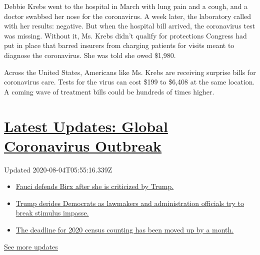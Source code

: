 Debbie Krebs went to the hospital in March with lung pain and a cough,
and a doctor swabbed her nose for the coronavirus. A week later, the
laboratory called with her results: negative. But when the hospital bill
arrived, the coronavirus test was missing. Without it, Ms. Krebs didn't
qualify for protections Congress had put in place that barred insurers
from charging patients for visits meant to diagnose the coronavirus. She
was told she owed \$1,980.

Across the United States, Americans like Ms. Krebs are receiving
surprise bills for coronavirus care. Tests for the virus can cost \$199
to \$6,408 at the same location. A coming wave of treatment bills could
be hundreds of times higher.

\hypertarget{latest-updates-global-coronavirus-outbreak}{%
\section{\texorpdfstring{\href{https://www.nytimes.com/2020/08/03/world/coronavirus-covid-19.html?action=click\&pgtype=Article\&state=default\&region=MAIN_CONTENT_1\&context=storylines_live_updates}{Latest
Updates: Global Coronavirus
Outbreak}}{Latest Updates: Global Coronavirus Outbreak}}\label{latest-updates-global-coronavirus-outbreak}}

Updated 2020-08-04T05:55:16.339Z

\begin{itemize}
\tightlist
\item
  \href{https://www.nytimes.com/2020/08/03/world/coronavirus-covid-19.html?action=click\&pgtype=Article\&state=default\&region=MAIN_CONTENT_1\&context=storylines_live_updates\#link-4547638f}{Fauci
  defends Birx after she is criticized by Trump.}
\item
  \href{https://www.nytimes.com/2020/08/03/world/coronavirus-covid-19.html?action=click\&pgtype=Article\&state=default\&region=MAIN_CONTENT_1\&context=storylines_live_updates\#link-15e7f995}{Trump
  derides Democrats as lawmakers and administration officials try to
  break stimulus impasse.}
\item
  \href{https://www.nytimes.com/2020/08/03/world/coronavirus-covid-19.html?action=click\&pgtype=Article\&state=default\&region=MAIN_CONTENT_1\&context=storylines_live_updates\#link-e5a2cda}{The
  deadline for 2020 census counting has been moved up by a month.}
\end{itemize}

\href{https://www.nytimes.com/2020/08/03/world/coronavirus-covid-19.html?action=click\&pgtype=Article\&state=default\&region=MAIN_CONTENT_1\&context=storylines_live_updates}{See
more updates}

